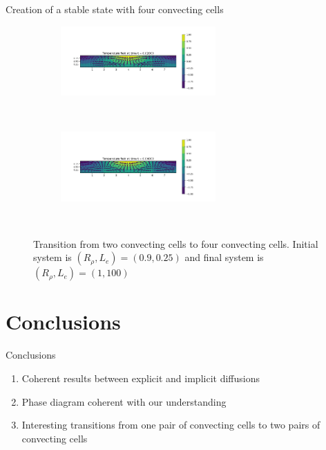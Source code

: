 \documentclass[10pt]{beamer}
\begin{document}
\begin{frame}{Creation of a stable state with four convecting cells}
  \begin{figure}[ht]
    \centering
    \begin{subfigure}{\textwidth}
      \centering
      \includegraphics[width=0.65\textwidth]{images/last_subsection/initial_four.png}
    \end{subfigure}\\
    \begin{subfigure}{\textwidth}
      \centering
      \includegraphics[width=0.65\textwidth]{images/last_subsection/final_four.png}
    \end{subfigure}\\
    \caption{Transition from two convecting cells to four convecting cells. Initial system is $(R_{\rho},L_e) = (0.9,0.25)$ and final system is $(R_{\rho},L_e) = (1,100)$}
    \label{fig:changeTS}
  \end{figure}
\end{frame}
\section{Conclusions}

\begin{frame}{Conclusions}
  \begin{enumerate}
    \item Coherent results between explicit and implicit diffusions
    \item Phase diagram coherent with our understanding
    \item Interesting transitions from one pair of convecting cells to two pairs of convecting cells
  \end{enumerate}
\end{frame}
\end{document}

